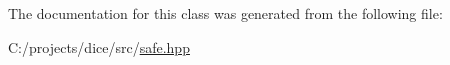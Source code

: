 The documentation for this class was generated from the following file\+:\begin{DoxyCompactItemize}
\item 
C\+:/projects/dice/src/\mbox{\hyperlink{safe_8hpp}{safe.\+hpp}}\end{DoxyCompactItemize}
